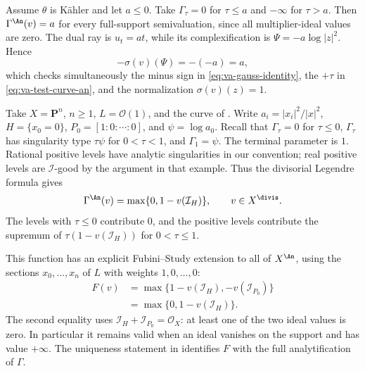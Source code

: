 \begin{example}
\label{ex:va-constant-endpoint}
Assume $\theta$ is K\"ahler and let $a\leq0$.  Take
$\Gamma_\tau=0$ for $\tau\leq a$ and $-\infty$ for $\tau>a$.
Then $\Gamma^{\An}(v)=a$ for every full-support semivaluation, since all
multiplier-ideal values are zero.  The dual ray is $u_t=at$, while its
complexification is
$\Psi=-a\log|z|^2$.  Hence
\[
                   -\sigma(v)(\Psi)=-(-a)=a,
\]
which checks simultaneously the minus sign in
\eqref{eq:va-gauss-identity}, the $+\tau$ in
\eqref{eq:va-test-curve-an}, and the normalization
$\sigma(v)(z)=1$.
\end{example}

\begin{example}
\label{ex:va-hyperplane-analytification}
Take $X=\mathbf P^n$, $n\geq1$, $L=\mathcal O(1)$, and the curve
of . Write
$a_i=|x_i|^2/|x|^2$, $H=\{x_0=0\}$,
$P_0=[1:0:\cdots:0]$, and $\psi=\log a_0$.
Recall that $\Gamma_\tau=0$ for $\tau\leq0$,
$\Gamma_\tau$ has singularity type $\tau\psi$ for $0<\tau<1$,
and $\Gamma_1=\psi$. The terminal parameter is $1$.
Rational positive levels have analytic singularities in our convention;
real positive levels are $\mathcal I$-good by the argument in that
example. Thus the divisorial Legendre formula gives
\[
 \Gamma^{\An}(v)=\max\{0,1-v(\mathcal I_H)\},
                         \qquad v\in X^{\divis}.
\]
The levels with $\tau\leq0$ contribute $0$, and the positive levels
contribute the supremum of $\tau(1-v(\mathcal I_H))$ for
$0<\tau\leq1$.

This function has an explicit Fubini--Study extension to all of
$X^{\An}$, using the sections $x_0,\ldots,x_n$ of $L$ with weights
$1,0,\ldots,0$:
\[
 \begin{split}
 F(v)&=\max\{1-v(\mathcal I_H),-v(\mathcal I_{P_0})\}\\
     &=\max\{0,1-v(\mathcal I_H)\}.
 \end{split}
\tag{56.9a}\label{eq:va-hyperplane-fs}
\]
The second equality uses
$\mathcal I_H+\mathcal I_{P_0}=\mathcal O_X$: at least one of the
two ideal values is zero. In particular it remains valid when an
ideal vanishes on the support and has value $+\infty$.
The uniqueness statement in 
identifies $F$ with the full analytification of $\Gamma$.


\end{example}
